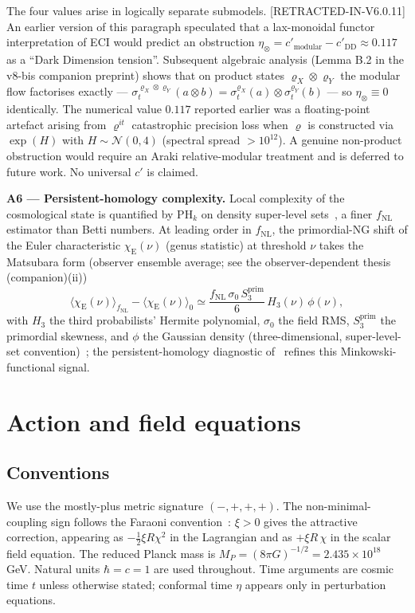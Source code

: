 \documentclass[reprint,amsmath,amssymb,aps,prd,superscriptaddress]{revtex4-2}
\providecommand{\1}{\mathbf{1}}
\begin{document}
The four values arise in logically separate submodels. [RETRACTED-IN-V6.0.11] An earlier version of this paragraph speculated that a lax-monoidal functor interpretation of ECI would predict an obstruction $\eta_\otimes = c'_{\mathrm{modular}} - c'_{\mathrm{DD}} \approx 0.117$ as a ``Dark Dimension tension''. Subsequent algebraic analysis (Lemma B.2 in the v8-bis companion preprint) shows that on product states $\varrho_X\otimes\varrho_Y$ the modular flow factorises exactly --- $\sigma_t^{\varrho_X\otimes\varrho_Y}(a\otimes b) = \sigma_t^{\varrho_X}(a)\otimes\sigma_t^{\varrho_Y}(b)$ --- so $\eta_\otimes \equiv 0$ identically. The numerical value $0.117$ reported earlier was a floating-point artefact arising from $\varrho^{it}$ catastrophic precision loss when $\varrho$ is constructed via $\exp(H)$ with $H\sim\mathcal{N}(0,4)$ (spectral spread $>10^{12}$). A genuine non-product obstruction would require an Araki relative-modular treatment and is deferred to future work. No universal $c'$ is claimed.

\smallskip
\noindent\textbf{A6 --- Persistent-homology complexity.}
Local complexity of the cosmological state is quantified by $\mathrm{PH}_k$ on density super-level sets~\cite{Yip2024,Calles2025}, a finer $f_{\mathrm{NL}}$ estimator than Betti numbers. At leading order in $f_{\mathrm{NL}}$, the primordial-NG shift of the Euler characteristic $\chi_{\mathrm{E}}(\nu)$ (genus statistic) at threshold $\nu$ takes the Matsubara form (observer ensemble average; see the observer-dependent thesis (companion)(ii))
\begin{equation}
\langle \chi_{\mathrm{E}}(\nu) \rangle_{f_{\mathrm{NL}}} - \langle \chi_{\mathrm{E}}(\nu) \rangle_{0} \simeq \frac{f_{\mathrm{NL}}\, \sigma_0\, S_3^{\mathrm{prim}}}{6}\, H_3(\nu)\, \phi(\nu),
\label{eq:A6-euler}
\end{equation}
with $H_3$ the third probabilists' Hermite polynomial, $\sigma_0$ the field RMS, $S_3^{\mathrm{prim}}$ the primordial skewness, and $\phi$ the Gaussian density (three-dimensional, super-level-set convention)~\cite{Matsubara2003}; the persistent-homology diagnostic of~\cite{Yip2024,Calles2025} refines this Minkowski-functional signal.



\section{Action and field equations}

\subsection*{Conventions}
We use the mostly-plus metric signature $(-,+,+,+)$. The non-minimal-coupling sign follows the Faraoni convention~\cite{Faraoni2004}: $\xi > 0$ gives the attractive correction, appearing as $-\tfrac{1}{2}\xi R \chi^2$ in the Lagrangian and as $+\xi R\,\chi$ in the scalar field equation. The reduced Planck mass is $M_P = (8\pi G)^{-1/2} = 2.435 \times 10^{18}$ GeV. Natural units $\hbar = c = 1$ are used throughout. Time arguments are cosmic time $t$ unless otherwise stated; conformal time $\eta$ appears only in perturbation equations.
\end{document}
